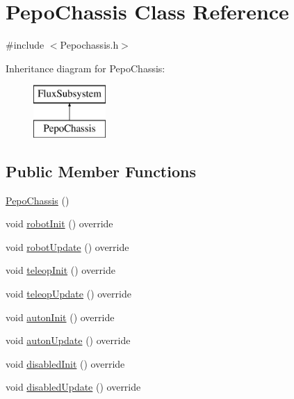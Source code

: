 \hypertarget{classPepoChassis}{}\section{Pepo\+Chassis Class Reference}
\label{classPepoChassis}


{\ttfamily \#include $<$Pepochassis.\+h$>$}

Inheritance diagram for Pepo\+Chassis\+:\begin{figure}[H]
\begin{center}
\leavevmode
\includegraphics[height=2.000000cm]{classPepoChassis}
\end{center}
\end{figure}
\subsection*{Public Member Functions}
\begin{DoxyCompactItemize}
\item 
\hyperlink{classPepoChassis_a5915627651b6f2731ec21834c17e9dbe}{Pepo\+Chassis} ()
\item 
void \hyperlink{classPepoChassis_a18dd25fff35cf7ccac6b710e329873e6}{robot\+Init} () override
\item 
void \hyperlink{classPepoChassis_acd6fa29da41ac5108af7e3a1f15218aa}{robot\+Update} () override
\item 
void \hyperlink{classPepoChassis_a44dbc37a56fe98d7b57af840e8da73b2}{teleop\+Init} () override
\item 
void \hyperlink{classPepoChassis_af863b7df039af7051b08c051f744e429}{teleop\+Update} () override
\item 
void \hyperlink{classPepoChassis_a10380f1dad79ff1daa295d0673a1051f}{auton\+Init} () override
\item 
void \hyperlink{classPepoChassis_ab1e73685898517c8fa2f81c5c7a6a56c}{auton\+Update} () override
\item 
void \hyperlink{classPepoChassis_af5f6848de51ac4c47cbf2f9f706b1485}{disabled\+Init} () override
\item 
void \hyperlink{classPepoChassis_a33af04df9c2396d6197f3298172763d9}{disabled\+Update} () override
\end{DoxyCompactItemize}


